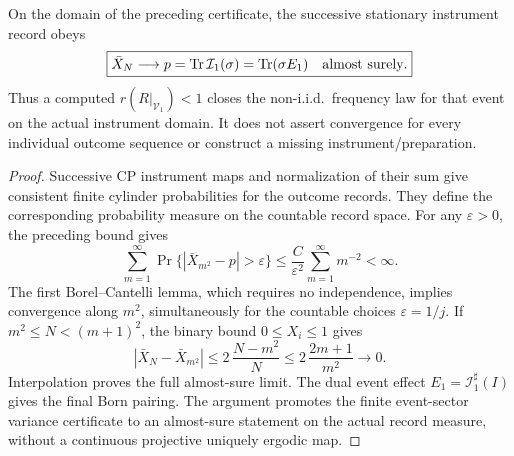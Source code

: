 \documentclass[12pt,a4paper]{article}
\begin{document}
\begin{corollary}
\label{p4:cor:v2211-event-frequency-strong-law}
On the domain of the preceding certificate, the successive stationary
instrument record obeys
\[
 \boxed{\bar X_N\longrightarrow p
       =\operatorname{Tr}\mathcal I_1(\sigma)
       =\operatorname{Tr}(\sigma E_1)
       \quad\hbox{almost surely}.}
\]
Thus a computed \(r(R|_{\mathcal V_1})<1\) closes the non-i.i.d.\
frequency law for that event on the actual instrument domain.  It does
not assert convergence for every individual outcome sequence or construct
a missing instrument/preparation.
\end{corollary}
\begin{proof}
Successive CP instrument maps and normalization of their sum give
consistent finite cylinder probabilities for the outcome records.
They define the corresponding probability measure on the countable
record space.  For any \(\varepsilon>0\), the preceding bound gives
\[
 \sum_{m=1}^{\infty}
 \Pr\{|\bar X_{m^2}-p|>\varepsilon\}
 \le\frac C{\varepsilon^2}\sum_{m=1}^{\infty}m^{-2}<\infty.
\]
The first Borel--Cantelli lemma, which requires no independence, implies
convergence along \(m^2\), simultaneously for the countable choices
\(\varepsilon=1/j\).  If \(m^2\le N<(m+1)^2\), the binary bound
\(0\le X_i\le1\) gives
\[
 |\bar X_N-\bar X_{m^2}|
 \le 2\,\frac{N-m^2}{N}
 \le2\,\frac{2m+1}{m^2}\longrightarrow0.
\]
Interpolation proves the full almost-sure limit.  The dual event effect
\(E_1=\mathcal I_1^\sharp(I)\) gives the final Born pairing.  The
argument promotes the finite event-sector variance certificate to an
almost-sure statement on the actual record measure, without a continuous
projective uniquely ergodic map.
\end{proof}
\end{document}
